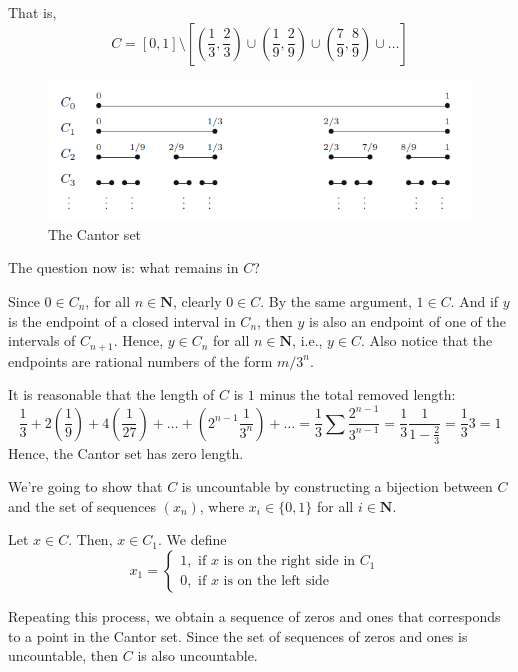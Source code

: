 \documentclass[tikz,12pt,a4paper]{article}
\theoremstyle{definition}
\begin{document}
That is,
\[
	C = [0,1] \setminus \left[ \left( \frac{1}{3}, \frac{2}{3} \right) \cup \left( \frac{1}{9}, \frac{2}{9} \right) \cup \left( \frac{7}{9}, \frac{8}{9} \right) \cup \ldots \right]
\]

\begin{figure}[h]
  \centering
  \includegraphics[width=\textwidth]{cantor-set}
  \caption{The Cantor set \cite{abbott2001understanding}}
  \label{fig:cantor-set}
\end{figure}

The question now is: what remains in $C$? 

Since $0 \in C_n$, for all $n \in \textbf{N}$, clearly $0 \in C$. By the same argument, $1 \in C$. And if $y$ is the endpoint of a closed interval in $C_n$, then $y$ is also an endpoint of one of the intervals of $C_{n+1}$. Hence, $y \in C_n$ for all $n \in \textbf{N}$, i.e., $y \in C$. Also notice that the endpoints are rational numbers of the form $m/3^n$.

It is reasonable that the length of $C$ is $1$ minus the total removed length:
\[
	\frac{1}{3} + 2 \left( \frac{1}{9} \right) + 4 \left( \frac{1}{27} \right) + \ldots + \left( 2^{n-1} \frac{1}{3^n} \right) + \ldots = \frac{1}{3} \sum \frac{2^{n-1}}{3^{n-1}} = \frac{1}{3} \frac{1}{1-\frac{2}{3}} = \frac{1}{3} 3 = 1
\]
Hence, the Cantor set has zero length.

We're going to show that $C$ is uncountable by constructing a bijection between $C$ and the set of sequences $(x_n)$, where $x_i \in \{0,1\}$ for all $i \in \textbf{N}$.

Let $x \in C$. Then, $x \in C_1$. We define
\begin{equation*}
  x_1 = \begin{cases}
      1, \text{ if $x$ is on the right side in $C_1$ } \\
  	  0, \text{ if $x$ is on the left side }
  \end{cases}
\end{equation*}

Repeating this process, we obtain a sequence of zeros and ones that corresponds to a point in the Cantor set. Since the set of sequences of zeros and ones is uncountable, then $C$ is also uncountable.
\end{document}
